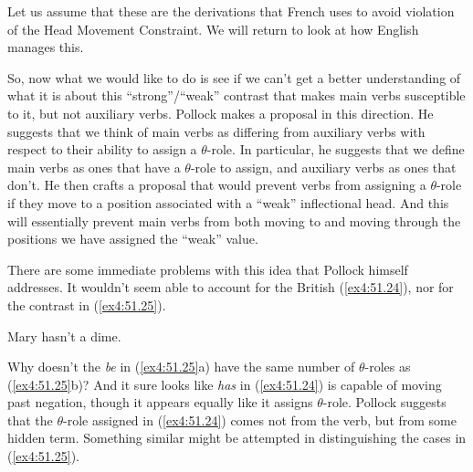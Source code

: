 Let us assume that these are the derivations that French uses to avoid violation of the Head Movement Constraint.%
%
 We will return to look at how English manages this.%
%

So, now what we would like to do is see if we can't get a better understanding of what it is about this ``strong''/``weak'' contrast that makes main verbs susceptible to it, but not auxiliary verbs. Pollock makes a proposal in this direction. He suggests that we think of main verbs as differing from auxiliary verbs with respect to their ability to assign a \mbox{$\theta$-role}. In particular, he suggests that we define main verbs as ones that have a \mbox{$\theta$-role} to assign, and auxiliary verbs as ones that don't. He then crafts a proposal that would prevent verbs from assigning a \mbox{$\theta$-role} if they move to a position associated with a ``weak'' inflectional head. And this will essentially prevent main verbs from both moving to and moving through the positions we have assigned the ``weak'' value.

There are some immediate problems with this idea that Pollock himself addresses. It wouldn't seem able to account for the British (\ref{ex4:51.24}), nor for the contrast in (\ref{ex4:51.25}).
\begin{exe}
	\ex \label{ex4:51.25} Mary hasn't a dime.
	\ex \label{ex4:51.24}
	\begin{xlist}
	\end{xlist}
\end{exe}
Why doesn't the \emph{be} in (\ref{ex4:51.25}a) have the same number of \mbox{$\theta$-role}s as (\ref{ex4:51.25}b)? And it sure looks like \emph{has} in (\ref{ex4:51.24}) is capable of moving past negation, though it appears equally like it assigns \mbox{$\theta$-role}. Pollock suggests that the \mbox{$\theta$-role} assigned in (\ref{ex4:51.24}) comes not from the verb, but from some hidden term. Something similar might be attempted in distinguishing the cases in (\ref{ex4:51.25}).


